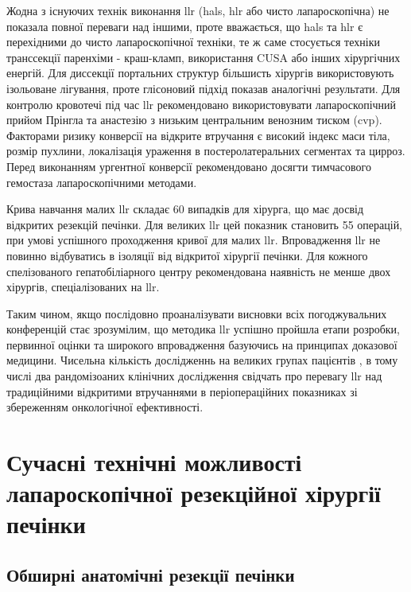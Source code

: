 \begin{refsection}
Жодна з існуючих технік виконання \acrshort{llr} (\acrshort{hals}, \acrshort{hlr} або чисто лапароскопічна) не показала повної переваги над іншими, проте вважається, що \acrshort{hals} та \acrshort{hlr} є перехідними до чисто лапароскопічної техніки, те ж саме стосується техніки транссекції паренхіми - краш-кламп, використання CUSA або інших хірургічних енергій. Для диссекції портальних структур більшисть хірургів використовують ізольоване лігування, проте глісоновий підхід показав аналогічні результати. Для контролю кровотечі під час \acrshort{llr} рекомендовано використовувати лапароскопічний прийом Прінгла та анастезію з низьким центральним венозним тиском (\acrshort{cvp}). Факторами ризику конверсії на відкрите втручання є високий індекс маси тіла, розмір пухлини, локалізація ураження в постеролатеральних сегментах та цирроз. Перед виконанням ургентної конверсії рекомендовано досягти тимчасового гемостаза лапароскопічними методами.

Крива навчання малих \acrshort{llr} складає 60 випадків для хірурга, що має досвід відкритих резекцій печінки. Для великих \acrshort{llr} цей показник становить 55 операцій, при умові успішного проходження кривої для малих \acrshort{llr}. Впровадження \acrshort{llr} не повинно відбуватись в ізоляції від відкритої хірургії печінки. Для кожного спелізованого гепатобіліарного центру рекомендована наявність не менше двох хірургів, спеціалізованих на \acrshort{llr}.

Таким чином, якщо послідовно проаналізувати висновки всіх погоджувальних конференцій стає зрозумілим, що методика \acrshort{llr} успішно пройшла етапи розробки, первинної оцінки та широкого впровадження базуючись на принципах доказової медицини. Чисельна кількість дослідженнь на великих групах пацієнтів \cite{Ciria2016b, Takahara2016, Berardi2017}, в тому числі два рандомізоаних клінічних дослідження \cite{Fretland2018b, Robles-Campos2019} свідчать про перевагу \acrshort{llr} над традиційними відкритими втручаннями в періопераційних показниках зі збереженням онкологічної ефективності.

\section{Сучасні технічні можливості лапароскопічної резекційної хірургії печінки}


\subsection{Обширні анатомічні резекції печінки}

\end{refsection}
